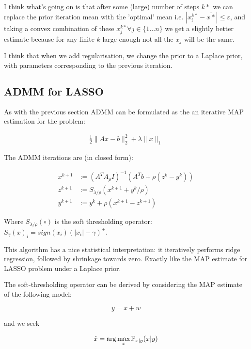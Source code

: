 \documentclass{article}
\begin{document}
I think what's going on is that after some (large) number of steps \(k*\) we can replace the prior iteration mean with the 'optimal' mean i.e. \(|x_i^{k*} - \bar{x*}| \leq \varepsilon \), and taking a convex combination of these \(x_j^{k*} \forall j \in \{1\ldots n\}\) we get a slightly better estimate because for any finite \(k\) large enough not all the \(x_j\) will be the same.

I think that when we add regularisation, we change the prior to a Laplace prior, with parameters corresponding to the previous iteration. 

\subsection{ADMM for LASSO}
As with the previous section ADMM can be formulated as the an iterative MAP estimation for the problem:

\begin{eqnarray}
\frac{1}{2}\|Ax-b\|_2^2 + \lambda\|x\|_1
\end{eqnarray}

The ADMM iterations are (in closed form):

\begin{align}
x^{k+1} &:= \left(A^TA _ \rho I\right)^{-1}\left(A^Tb +\rho\left(z^k - y^k\right)\right)\\
z^{k+1} &:= S_{\lambda/\rho}\left(x^{k+1} + y^k/\rho\right)
 \\
y^{k+1} &:= y^{k} + \rho \left(x^{k+1}-z^{k+1}\right)
\label{admm_algo_lasso}
\end{align}

Where \(S_{\lambda/\rho}\left(\circ\right)\) is the soft thresholding operator: \(S_\gamma\left(x\right)_i = sign(x_i)\left(|x_i| - \gamma\right)^+\).

This algorithm has a nice statistical interpretation: it iteratively performs ridge regression, followed by shrinkage towards zero. Exactly like the MAP estimate for LASSO problem under a Laplace prior.

The soft-thresholding operator can be derived by considering the MAP estimate of the following model:

\begin{equation}
y = x + w
\end{equation}

and we seek

\begin{equation}
\hat{x} = \arg\max_x {\mathbb{P}}_{x|y}{\left(x|y\right)}
\end{equation}
\end{document}
